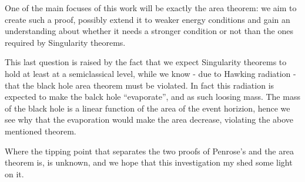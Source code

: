 \documentclass[12pt, a4paper]{article}
\begin{document}
One of the main focuses of this work will be exactly the area theorem: we aim to create such a proof, possibly extend it to weaker energy conditions and gain an understanding about whether it needs a stronger condition or not than the ones required by Singularity theorems.

This last question is raised by the fact that we expect Singularity theorems to hold at least at a semiclassical level, while we know - due to Hawking radiation - that the black hole area theorem must be violated. 
In fact this radiation is expected to make the balck hole ``evaporate'', and as such loosing mass. The mass of the black hole is a linear function of the area of the event horizion, hence we see why that the evaporation would make the area decrease, violating the above mentioned theorem.

Where the tipping point that separates the two proofs of Penrose's and the area theorem is, is unknown, and we hope that this investigation my shed some light on it.



\clearpage

\printbibliography
\end{document}
